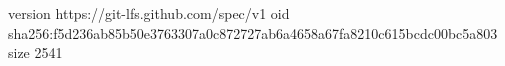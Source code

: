 version https://git-lfs.github.com/spec/v1
oid sha256:f5d236ab85b50e3763307a0c872727ab6a4658a67fa8210c615bcdc00bc5a803
size 2541
